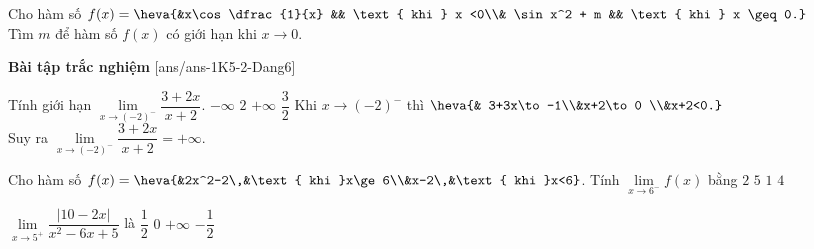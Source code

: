 \begin{bt}%
Cho hàm số $f(x) = \heva{&x\cos \dfrac{1}{x} && \text{ khi } x <0\\& \sin x^2 + m  && \text{ khi } x \geq 0.}$ \\
Tìm $m$ để hàm số $f(x)$ có giới hạn khi $x \to 0$.
\end{bt}
\noindent \textbf{Bài tập trắc nghiệm}
[ans/ans-1K5-2-Dang6]
\begin{ex}%
	Tính giới hạn $\lim\limits_{x \to(-2)^{-}} \dfrac{3+2 x}{x+2}$.
	\choice
	{$-\infty$}
	{$2$}
	{\True $+\infty$}
	{$\dfrac{3}{2}$}
	\loigiai
	{
		Khi $x \to (-2)^{-}$ thì $\heva{& 3+3x\to -1\\&x+2\to 0 \\&x+2<0.}$ \\
		Suy ra  $\lim\limits_{x \to(-2)^{-}} \dfrac{3+2 x}{x+2}=+\infty$.
	}
\end{ex}

\begin{ex}%
Cho hàm số $f(x)=\heva{&2x^2-2\,&\text{ khi }x\ge 6\\&x-2\,&\text{ khi }x<6}$. Tính $\lim\limits_{x\to 6^-}f(x)$ bằng
\choice
{$2$}
{$5$}
{$1$}
{\True $4$}
\end{ex}


\begin{ex}%
$\displaystyle \lim \limits_{x \rightarrow 5^+} \dfrac{|10-2x|}{x^2-6x+5}$ là
\choice
{\True $\dfrac{1}{2}$}
{$0$}
{$+\infty$}
{$- \dfrac{1}{2}$}
\end{ex}

